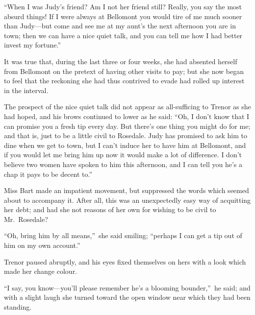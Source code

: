 \documentclass[12pt,a4paper]{book}
\begin{document}
``When I was Judy's friend? Am I not her friend still? Really, you
say the most absurd things! If I were always at Bellomont you
would tire of me much sooner than Judy---but come and see me at my
aunt's the next afternoon you are in town; then we can have a
nice quiet talk, and you can tell me how I had better invest my
fortune.''





It was true that, during the last three or four weeks, she had
absented herself from Bellomont on the pretext of having other
visits to pay; but she now began to feel that the reckoning she
had thus contrived to evade had rolled up interest in the
interval.





The prospect of the nice quiet talk did not appear as all-sufficing
to Trenor as she had hoped, and his brows continued to lower
as he said: ``Oh, I don't know that I can promise you a fresh tip
every day. But there's one thing you might do for me;
and that is, just to be a little civil to Rosedale. Judy has
promised to ask him to dine when we get to town, but I can't
induce her to have him at Bellomont, and if you would let me
bring him up now it would make a lot of difference. I don't
believe two women have spoken to him this afternoon, and I can
tell you he's a chap it pays to be decent to.''





Miss Bart made an impatient movement, but suppressed the words
which seemed about to accompany it. After all, this was an
unexpectedly easy way of acquitting her debt; and had she not
reasons of her own for wishing to be civil to Mr.\ Rosedale?





``Oh, bring him by all means,''\ she said smiling; ``perhaps I can
get a tip out of him on my own account.''





Trenor paused abruptly, and his eyes fixed themselves on hers
with a look which made her change colour.





``I say, you know---you'll please remember he's a blooming
bounder,''\ he said; and with a slight laugh she turned toward the
open window near which they had been standing.
\end{document}
